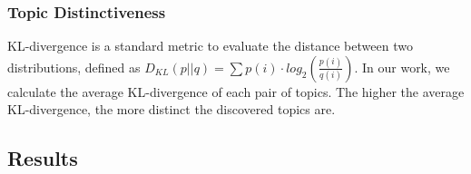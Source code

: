 \subsubsection{Topic Distinctiveness}
%
%
KL-divergence is a standard metric to evaluate the distance between two distributions, defined as $D_{KL}(p||q) = \sum{p(i) \cdot log_2(\frac{p(i)}{q(i)})}$. In our work, we calculate the average KL-divergence of each pair of topics. The higher the average KL-divergence, the more distinct the discovered topics are.
%
\subsection{Results} \label{sec:results}
%
\begin{figure}[ht]
\advance\leftskip-4cm
\centering
{}
\end{figure}
